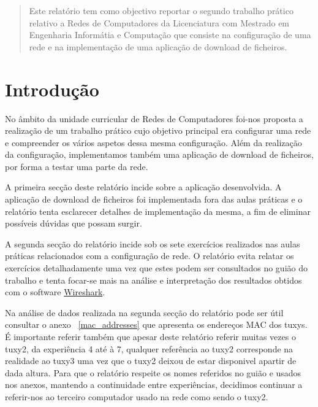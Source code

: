 \documentclass[11pt,a4paper,reqno]{report}
\numberwithin{equation}{section}
\begin{document}



\begin{abstract}
	
Este relatório tem como objectivo reportar o segundo trabalho prático relativo a Redes de Computadores da Licenciatura com Mestrado em Engenharia Informátia e Computação que consiste na configuração de uma rede e na implementação de uma aplicação de download de ficheiros.


\end{abstract}

\tableofcontents

\pagebreak
\chapter{Introdução}

No âmbito da unidade curricular de Redes de Computadores foi-nos proposta a realização de um trabalho prático cujo objetivo principal era configurar uma rede e compreender os vários aspetos dessa mesma configuração. Além da realização da configuração, implementamos também uma aplicação de download de ficheiros, por forma a testar uma parte da rede.

A primeira secção deste relatório incide sobre a aplicação desenvolvida. A aplicação de download de ficheiros foi implementada fora das aulas práticas e o relatório tenta esclarecer detalhes de implementação da mesma, a fim de eliminar possíveis dúvidas que possam surgir.

A segunda secção do relatório incide sob os sete exercícios realizados nas aulas práticas relacionados com a configuração de rede. O relatório evita relatar os exercícios detalhadamente uma vez que estes podem ser consultados no guião do trabalho e tenta focar-se mais na análise e interpretação dos resultados obtidos com o software \href{https://www.wireshark.org/}{Wireshark}.

Na análise de dados realizada na segunda secção do relatório pode ser útil consultar o anexo ~\ref{mac_addresses} que apresenta os endereços MAC dos tuxys. É importante referir também que apesar deste relatório referir muitas vezes o tuxy2, da experiência 4 até à 7, qualquer referência ao tuxy2 corresponde na realidade ao tuxy3 uma vez que o tuxy2 deixou de estar disponivel apartir de dada altura. Para que o relatório respeite os nomes referidos no guião e usados nos anexos, mantendo a continuidade entre experiências, decidimos continuar a referir-nos ao terceiro computador usado na rede como sendo o tuxy2.  
	
\end{document}
